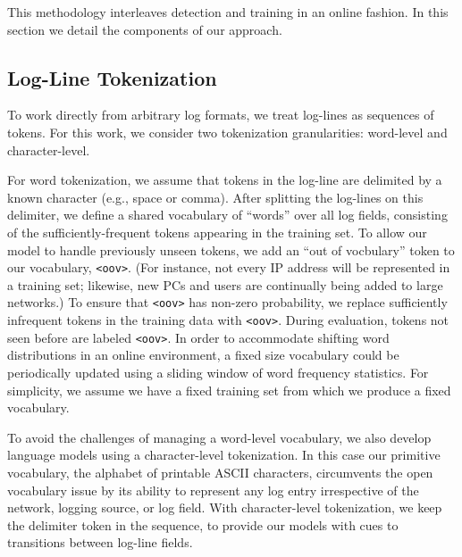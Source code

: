 \documentclass[letterpaper]{article} %
\begin{document}
This methodology interleaves detection and training in an online fashion.  
In this section we detail the components of our approach.

\subsection{Log-Line Tokenization} \label{subsec:token}
To work directly from arbitrary log formats, we treat log-lines as sequences of tokens. 
For this work, we consider two tokenization granularities: word-level and character-level.  

For word tokenization, we assume that tokens in the log-line are delimited by a known character (e.g., space or comma).  
After splitting the log-lines on this delimiter, we define a shared vocabulary of ``words'' over all log fields, consisting of the sufficiently-frequent tokens appearing in the training set.
To allow our model to handle previously unseen tokens, we add an ``out of vocbulary'' token to our vocabulary, \verb|<oov>|. 
(For instance, not every IP address will be represented in a training set; likewise, new PCs and users are continually being added to large networks.) 
To ensure that \verb|<oov>| has non-zero probability, we replace sufficiently infrequent tokens in the training data with \verb|<oov>|.  
During evaluation, tokens not seen before are labeled \verb|<oov>|.
In order to accommodate shifting word distributions in an online environment, a fixed size vocabulary could be periodically updated using a sliding window of word frequency statistics. For simplicity, we assume we have a fixed training set from which we produce a fixed vocabulary.

To avoid the challenges of managing a word-level vocabulary, we also develop language models using a character-level tokenization. 
In this case our primitive vocabulary, the alphabet of printable ASCII characters, circumvents the open vocabulary issue by its ability to represent any log entry irrespective of the network, logging source, or log field.  With character-level tokenization, we keep the delimiter token in the sequence, to provide our models with cues to transitions between log-line fields.

\end{document}
